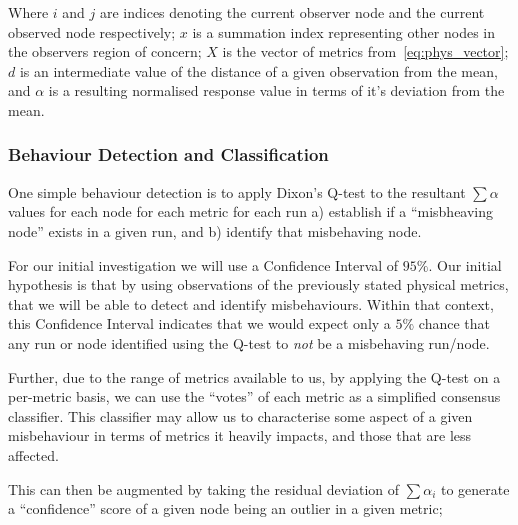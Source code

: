 \documentclass[conference]{IEEEtran}
\begin{document}
Where $i$ and $j$ are indices denoting the current observer node and the current observed node respectively; $x$ is a summation index representing other nodes in the observers region of concern; $X$ is the vector of metrics from~\ref{eq:phys_vector}; $d$ is an intermediate value of the distance of a given observation from the mean, and $\alpha$ is a resulting normalised response value in terms of it's deviation from the mean.

\subsubsection{Behaviour Detection and Classification}

One simple behaviour detection is to apply Dixon's Q-test \cite{Dean1951} to the resultant $\sum\alpha$ values for each node for each metric for each run  a) establish if a ``misbheaving node'' exists in a given run, and b) identify that misbehaving node. 


For our initial investigation we will use a Confidence Interval of $95\%$.
Our initial hypothesis is that by using observations of the previously stated physical metrics, that we will be able to detect and identify misbehaviours.
Within that context, this Confidence Interval indicates that we would expect only a $5\%$ chance that any run or node identified using the Q-test to \emph{not} be a misbehaving run/node.

Further, due to the range of metrics available to us, by applying the Q-test on a per-metric basis, we can use the ``votes'' of each metric as a simplified consensus classifier.
This classifier may allow us to characterise some aspect of a given misbehaviour in terms of metrics it heavily impacts, and those that are less affected.

This can then be augmented by taking the residual deviation of $\sum\alpha_{i}$ to generate a ``confidence'' score of a given node being an outlier in a given metric;
\end{document}
